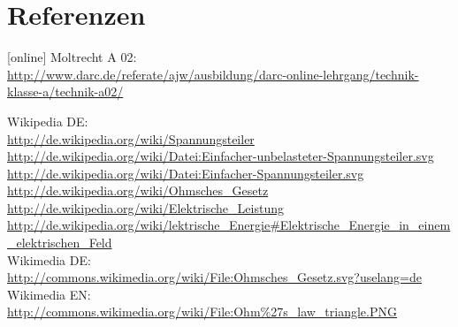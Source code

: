 \section{Referenzen}
\begin{small}
  \begin{thebibliography}{}
      [online]
      Moltrecht A 02: \\
      \url{http://www.darc.de/referate/ajw/ausbildung/darc-online-lehrgang/technik-klasse-a/technik-a02/}

        Wikipedia DE: \\
      \url{http://de.wikipedia.org/wiki/Spannungsteiler}\\
      \url{http://de.wikipedia.org/wiki/Datei:Einfacher-unbelasteter-Spannungsteiler.svg}\\
      \url{http://de.wikipedia.org/wiki/Datei:Einfacher-Spannungsteiler.svg}\\
      \url{http://de.wikipedia.org/wiki/Ohmsches_Gesetz}\\
      \url{http://de.wikipedia.org/wiki/Elektrische_Leistung}\\
      \url{http://de.wikipedia.org/wiki/lektrische_Energie#Elektrische_Energie_in_einem_elektrischen_Feld}\\

    	Wikimedia DE:\\
      \url{http://commons.wikimedia.org/wiki/File:Ohmsches_Gesetz.svg?uselang=de}\\
    	Wikimedia EN:\\
      \url{http://commons.wikimedia.org/wiki/File:Ohm\%27s_law_triangle.PNG}
  \end{thebibliography}
\end{small}


